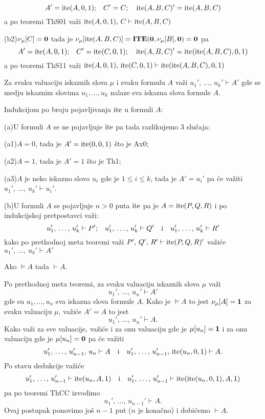 $$A'=\mathop{\rm ite}\nolimits(A,0,1)\hbox{;\quad}C'=C\hbox{;\quad}\mathop{\rm ite}\nolimits(A,B,C)'=\mathop{\rm ite}\nolimits(A,B,C)$$
a po teoremi ThS01 va\v zi $\mathop{\rm ite}\nolimits(A,0,1),\,C\vdash\mathop{\rm ite}\nolimits(A,B,C)$
\item{(b2)}$\nu_\mu[C]={\bf 0}$ tada je
$\nu_\mu[\mathop{\rm ite}\nolimits(A,B,C)]=\mathop{\bf ITE}\nolimits({\bf 0},\nu_\mu[B],{\bf 0})={\bf 0}$ pa
$$A'=\mathop{\rm ite}\nolimits(A,0,1)\hbox{;\quad}C'=\mathop{\rm ite}\nolimits(C,0,1)\hbox{;\quad}\mathop{\rm ite}\nolimits(A,B,C)'=\mathop{\rm ite}\nolimits(\mathop{\rm ite}\nolimits(A,B,C),0,1)$$
a po teoremi ThS11 va\v zi $\mathop{\rm ite}\nolimits(A,0,1),\,\mathop{\rm ite}\nolimits(C,0,1)\vdash\mathop{\rm ite}\nolimits(\mathop{\rm ite}\nolimits(A,B,C),0,1)$
\par
\Blackbox
\bigskip
%
%
 Za svaku valuaciju iskaznih slova $\mu$ i svaku
formulu $A$ va\v zi $u_1',\,\ldots,\,u_k'\vdash A'$ gde se medju iskaznim
slovima $u_1,\ldots,u_k$ nalaze sva iskazna slova formule $A$.
\par
{} Indukcijom po broju pojavljivanja $\mathop{\rm ite}\nolimits$ u formuli $A$:
\item{(a)}U formuli $A$ se ne pojavljuje $\mathop{\rm ite}\nolimits$ pa tada razlikujemo 3 slu\v caja:
\item{(a1)}$A=0$, tada je $A'=\mathop{\rm ite}\nolimits(0,0,1)$ \v sto je Ax0;
\item{(a2)}$A=1$, tada je $A'=1$ \v sto je Th1;
\item{(a3)}$A$ je neko iskazno slovo $u_i$ gde je $1\le i\le k$, tada je
$A'=u_i'$ pa \'ce va\v ziti $u_1',\,\ldots,\,u_k'\vdash u_i'$.
\smallskip
\item{(b)}U formuli $A$ se pojavljuje $n>0$ puta $\mathop{\rm ite}\nolimits$ pa je $A=\mathop{\rm ite}\nolimits(P,Q,R)$
i po indukcijskoj pretpostavci va\v zi:
$$u_1',\,\ldots,\,u_k'\vdash P'\hbox{;\quad}
u_1',\,\ldots,\,u_k'\vdash Q'\hbox{\quad i\quad}
u_1',\,\ldots,\,u_k'\vdash R'$$
kako po prethodnoj meta teoremi va\v zi $P',\,Q',\,R'\vdash\mathop{\rm ite}\nolimits(P,Q,R)'$
va\v zi\'ce $u_1',\,\ldots,\,u_k'\vdash A'$
\par
\Blackbox
\bigskip
%
%
 Ako $\models A$ tada $\vdash A$.
\par
{} Po prethodnoj meta teoremi, za svaku valuaciju iskaznih
slova $\mu$ va\v zi
$$u_1',\,\ldots,\,u_n'\vdash A'$$
gde su $u_1,\ldots,u_n$ sva iskazna slova formule $A$.
Kako je $\models A$ to jest $\nu_\mu[A]={\bf 1}$ za svaku valuaciju $\mu$,
va\v zi\'ce $A'=A$ to jest
$$u_1',\,\ldots,\,u_n'\vdash A.$$
Kako va\v zi za sve valuacije, va\v zi\'ce i za onu valuaciju gde je
$\mu[u_n]={\bf 1}$ i za onu valuaciju gde je $\mu[u_n]={\bf 0}$ pa \'ce
va\v ziti
$$u_1',\,\ldots,\,u_{n-1}',\,u_n\vdash A\hbox{\quad i\quad}u_1',\,\ldots,\,u_{n-1}',\,\mathop{\rm ite}\nolimits(u_n,0,1)\vdash A.$$
Po stavu dedukcije va\v zi\'ce
$$u_1',\,\ldots,\,u_{n-1}'\vdash\mathop{\rm ite}\nolimits(u_n,A,1)\hbox{\quad i\quad}u_1',\,\ldots,\,u_{n-1}'\vdash\mathop{\rm ite}\nolimits(\mathop{\rm ite}\nolimits(u_n,0,1),A,1)$$
pa po teoremi ThCC izvodimo
$$u_1',\,\ldots,\,u_{n-1}'\vdash A.$$
Ovaj postupak ponovimo jo\v s $n-1$ put ($n$ je kona\v cno) i dobi\'cemo
$\vdash A$.
\par
\Blackbox
\bye
